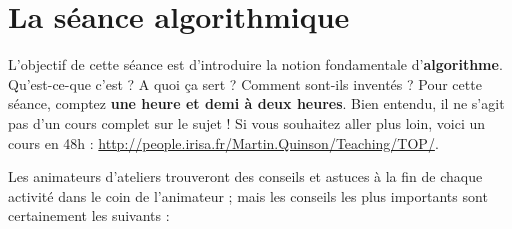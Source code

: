 \documentclass[a5paper,pagesize,DIV=14]{scrbook}
\begin{document}

\section*{La séance algorithmique}

L'objectif de cette séance est d'introduire la notion fondamentale
d'\textbf{al\-gorithme}. Qu'est-ce-que c'est ? A quoi ça sert ? Comment sont-ils
inventés ? Pour cette séance, comptez \textbf{une heure et demi à deux
  heures}. Bien entendu, il ne s'agit pas d'un cours complet sur le sujet ! Si
vous souhaitez aller plus loin, voici un cours en 48h :
\url{http://people.irisa.fr/Martin.Quinson/Teaching/TOP/}.

Les animateurs d'ateliers trouveront des conseils et astuces à la fin de chaque
activité dans \og le coin de l'animateur \fg ; mais les conseils les plus
importants sont certainement les suivants :
\end{document}
